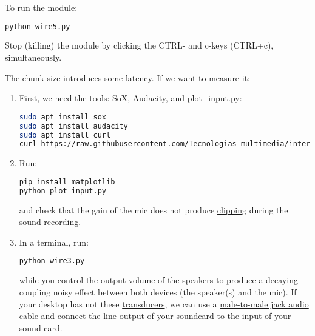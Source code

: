 To run the module:

\begin{lstlisting}[language=Bash]
python wire5.py
\end{lstlisting}

Stop (killing) the module by clicking the CTRL- and c-keys (CTRL+c),
simultaneously.

The chunk size introduces some latency. If we want to measure it:

\begin{enumerate}
\item First, we need the tools:
  \href{http://sox.sourceforge.net/}{SoX},
  \href{https://www.audacityteam.org/}{Audacity}, and
  \href{https://raw.githubusercontent.com/Tecnologias-multimedia/intercom/master/test/sounddevice/plot_input.py}{plot\_input.py}:
  
  \begin{lstlisting}[language=Bash]
sudo apt install sox
sudo apt install audacity
sudo apt install curl
curl https://raw.githubusercontent.com/Tecnologias-multimedia/intercom/master/test/sounddevice/plot_input.py > plot_input.py
  \end{lstlisting}
  
\item Run:
  
  \begin{lstlisting}[language=Bash]
pip install matplotlib
python plot_input.py
  \end{lstlisting}

  and check that the gain of the mic does not produce
  \href{https://en.wikipedia.org/wiki/Clipping_(audio)}{clipping}
  during the sound recording.

\item \label{start_point} In a terminal, run:

  \begin{lstlisting}[language=Bash]
python wire3.py
  \end{lstlisting}

  while you control the output volume of the speakers to produce a
  decaying coupling noisy effect between both devices (the speaker(s)
  and the mic). If your desktop has not these
  \href{https://en.wikipedia.org/wiki/Transducer}{transducers}, we can
  use a
  \href{https://www.google.com/search?q=male+to+male+audio+jack+cable&client=firefox-b-d&sxsrf=ALeKk00GZUDGqiOfc0D8xkA_MIYgCuZmSA:1600270049146&source=lnms&tbm=isch&sa=X&ved=2ahUKEwjdvsu-_u3rAhXl0eAKHS90DUoQ_AUoAXoECA0QAw&biw=4288&bih=972}{male-to-male
    jack audio cable} and connect the line-output of your soundcard to
  the input of your sound card.


\end{enumerate}
